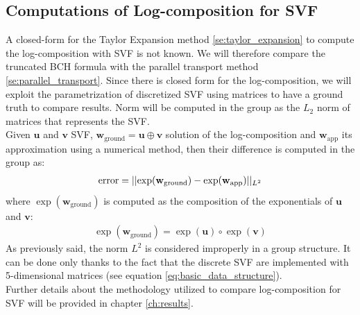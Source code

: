\subsection{Computations of Log-composition for SVF}
A closed-form for the Taylor Expansion method \ref{se:taylor_expansion} to compute the log-composition with SVF is not known. We will therefore compare the truncated BCH formula with the parallel transport method \ref{se:parallel_transport}. Since there is closed form for the log-composition, we will exploit the parametrization of discretized SVF using matrices to have a ground truth to compare results. Norm will be computed in the group as the $L_2$ norm of matrices that represents the SVF. \\ 
Given $\mathbf{u}$ and $\mathbf{v}$ SVF, $\mathbf{w}_{\text{ground}} = \mathbf{u}\oplus \mathbf{v}$ solution of the log-composition and $\mathbf{w}_{\text{app}}$ its approximation using a numerical method, then their difference is computed in the group as:
\begin{align*}
\text{error} = \vert\lvert \exp(\mathbf{w}_{\text{ground}}) - \exp(\mathbf{w}_{\text{app}}) \rvert\vert_{L^{2}}
\end{align*}
where $\exp(\mathbf{w}_{\text{ground}})$ is computed as the composition of the exponentials of $\mathbf{u}$ and $\mathbf{v}$:
\begin{align*}
\exp(\mathbf{w}_{\text{ground}}) = \exp(\mathbf{u})\circ \exp(\mathbf{v})
\end{align*}
As previously said, the norm $L^2$ is considered improperly in a group structure. It can be done only thanks to the fact that the discrete SVF are implemented with 5-dimensional matrices (see equation \ref{eq:basic_data_structure}).\\

Further details about the methodology utilized to compare log-composition for SVF will be provided in chapter \ref{ch:results}.






